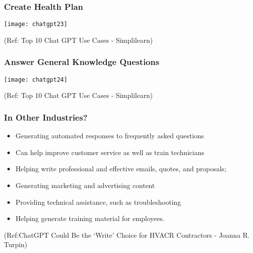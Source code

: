 \begin{frame}[fragile]\frametitle{Create Health Plan}
\begin{center}
\texttt{[image: chatgpt23]}
\end{center}

{\tiny (Ref: Top 10 Chat GPT Use Cases - Simplilearn)}
\end{frame}

\begin{frame}[fragile]\frametitle{Answer General Knowledge Questions}
\begin{center}
\texttt{[image: chatgpt24]}
\end{center}

{\tiny (Ref: Top 10 Chat GPT Use Cases - Simplilearn)}
\end{frame}

\begin{frame}[fragile]\frametitle{In Other Industries?}


\begin{itemize}
\item Generating automated responses to frequently asked questions 
\item Can help improve customer service as well as
train technicians
\item Helping write professional and effective emails, quotes, and proposals;
\item Generating marketing and advertising content
\item Providing technical assistance, such as troubleshooting
\item Helping generate training material for employees.
\end{itemize}	 

\tiny{(Ref:ChatGPT Could Be the ‘Write’ Choice for HVACR Contractors - Joanna R. Turpin)}
\end{frame}


